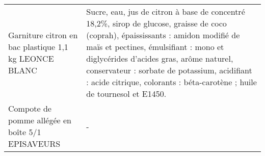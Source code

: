 \begin{longtable}{p{5cm}p{10cm}}
                                                    Garniture citron en bac plastique 1,1 kg LEONCE BLANC &                                                                                                                                                                                                                                                                                                                                                                                                                                                                                                                                                                                                                                                                                         Sucre, eau, jus de citron à base de concentré 18,2\%, sirop de glucose, graisse de coco (coprah), épaississants : amidon modifié de maïs et pectines, émulsifiant : mono et diglycérides d'acides gras, arôme naturel, conservateur : sorbate de potassium, acidifiant : acide citrique, colorants : béta-carotène ; huile de tournesol et E1450. \\
                                                         Compote de pomme allégée en boîte 5/1 EPISAVEURS &                                                                                                                                                                                                                                                                                                                                                                                                                                                                                                                                                                                                                                                                                                                                                                                                                                                                                                                                                                                                                                        - \\

\end{longtable}
